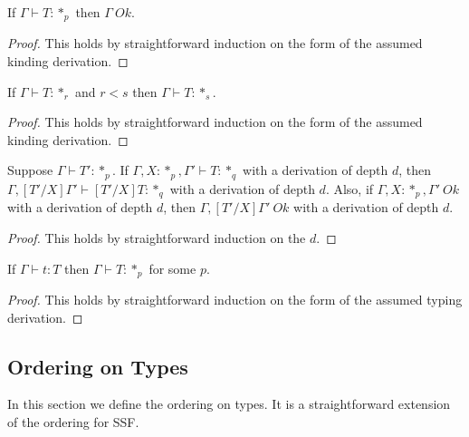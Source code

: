 \begin{lemma}
  If $\Gamma \vdash T:*_p$ then $\Gamma\ Ok$.
  \label{lemma:kinding_ok_ssfp}
\end{lemma}
\begin{proof}
  This holds by straightforward induction on the form of the assumed
  kinding derivation.
\end{proof}

\begin{lemma}
  If $\Gamma \vdash T:*_r$ and $r < s$ then $\Gamma \vdash T:*_s$.
  \label{lemma:level_weakening_for_kinding_ssfp}
\end{lemma}
\begin{proof}
  This holds by straightforward induction on the form of the assumed
  kinding derivation.
\end{proof}

\begin{lemma}
  Suppose $\Gamma \vdash T':*_p$.  If $\Gamma,X:*_p,\Gamma' \vdash T:*_q$ 
  with a derivation of depth $d$, then $\Gamma,[T'/X]\Gamma' \vdash [T'/X]T:*_q$
  with a derivation of depth $d$.
  Also, if $\Gamma,X:*_p,\Gamma'\ Ok$ with a derivation of depth $d$, then 
  $\Gamma,[T'/X]\Gamma'\ Ok$ with a derivation of depth $d$.
  \label{lemma:substitution_for_kinding_ssfp}
\end{lemma}
\begin{proof}
  This holds by straightforward induction on the $d$.
\end{proof}

\begin{lemma}[Regularity]
  If $\Gamma \vdash t:T$ then $\Gamma \vdash T:*_p$ for some $p$.
  \label{lemma:regularity_ssfp}
\end{lemma}
\begin{proof}
  This holds by straightforward induction on the form of the assumed
  typing derivation.
\end{proof}

\subsection{Ordering on Types}
\label{subsec:ordering_on_types_ssfp}
In this section we define the ordering on types. It is a
straightforward extension of the ordering for SSF.

